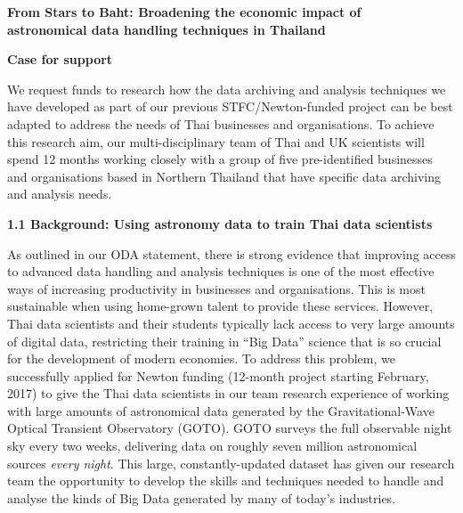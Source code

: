 \documentclass[11pt]{article}
\begin{document}
  \setcounter{figure}{0}
  \noindent
  {\LARGE \bf From Stars to Baht: Broadening the economic impact of \\
  astronomical data handling techniques in Thailand}
  
  \vspace{3mm}
  \noindent
  {\LARGE \bf Case for support}
  \vspace{3mm}
  
  \noindent
  We request funds to research how the data archiving and analysis techniques we have developed as part of our previous STFC/Newton-funded project can be best adapted to address the needs of Thai businesses and organisations. To achieve this research aim, our multi-disciplinary team of Thai and UK scientists will spend 12 months working closely with a group of five pre-identified businesses and organisations based in Northern Thailand that have specific data archiving and analysis needs.
  
  \vspace{3mm}
  \noindent
  {\large \bf 1.1 Background: Using astronomy data to train Thai data scientists}
  
  \noindent
  As outlined in our ODA statement, there is strong evidence that improving access to advanced data handling and analysis techniques is one of the most effective ways of increasing productivity in businesses and organisations. This is most sustainable when using home-grown talent to provide these services. However, Thai data scientists and their students typically lack access to very large amounts of digital data, restricting their training in ``Big Data'' science that is so crucial for the development of modern economies. To address this problem, we successfully applied for Newton funding (12-month project starting February, 2017) to give the Thai data scientists in our team research experience of working with large amounts of astronomical data generated by the Gravitational-Wave Optical Transient Observatory (GOTO). GOTO surveys the full observable night sky every two weeks, delivering data on roughly seven million astronomical sources {\it every night}. This large, constantly-updated dataset has given our research team the opportunity to develop the skills and techniques needed to handle and analyse the kinds of Big Data generated by many of today's industries.
  
\end{document}
